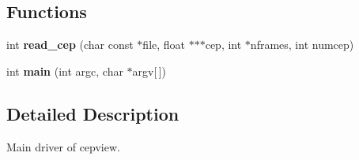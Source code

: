\subsection*{Functions}
\begin{DoxyCompactItemize}
\item 
int {\bfseries read\+\_\+cep} (char const $\ast$file, float $\ast$$\ast$$\ast$cep, int $\ast$nframes, int numcep)\label{main__cepview_8c_ad215db6a8261bb1c920d087564a1dd87}

\item 
int {\bfseries main} (int argc, char $\ast$argv[$\,$])\label{main__cepview_8c_a0ddf1224851353fc92bfbff6f499fa97}

\end{DoxyCompactItemize}


\subsection{Detailed Description}
Main driver of cepview. 

